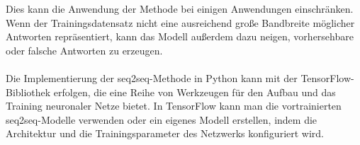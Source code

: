 Dies kann die Anwendung der Methode bei einigen Anwendungen einschränken. 
Wenn der Trainingsdatensatz nicht eine ausreichend große Bandbreite möglicher Antworten repräsentiert, kann das Modell außerdem dazu neigen, vorhersehbare oder falsche Antworten zu erzeugen.\\\\
Die Implementierung der seq2seq-Methode in Python kann mit der TensorFlow-Bibliothek erfolgen, die eine Reihe von Werkzeugen für den Aufbau und das Training neuronaler Netze bietet. 
In TensorFlow kann man die vortrainierten seq2seq-Modelle verwenden oder ein eigenes Modell erstellen, indem die Architektur und die Trainingsparameter des Netzwerks konfiguriert wird. \cite{tensorflow}
\endinput